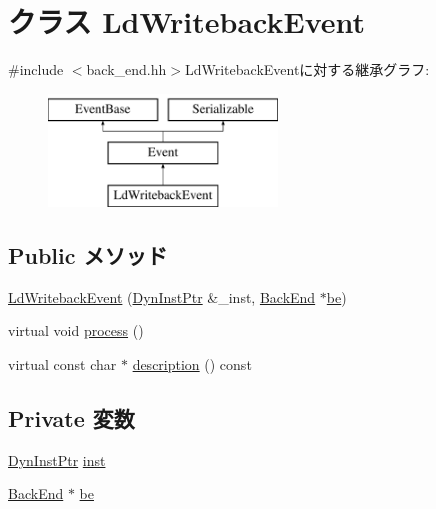 \hypertarget{classBackEnd_1_1LdWritebackEvent}{
\section{クラス LdWritebackEvent}
\label{classBackEnd_1_1LdWritebackEvent}
}


{\ttfamily \#include $<$back\_\-end.hh$>$}LdWritebackEventに対する継承グラフ:\begin{figure}[H]
\begin{center}
\leavevmode
\includegraphics[height=3cm]{classBackEnd_1_1LdWritebackEvent}
\end{center}
\end{figure}
\subsection*{Public メソッド}
\begin{DoxyCompactItemize}
\item 
\hyperlink{classBackEnd_1_1LdWritebackEvent_acb4a3159b31096e59f3c05256151e7e0}{LdWritebackEvent} (\hyperlink{classBackEnd_a028ce10889c5f6450239d9e9a7347976}{DynInstPtr} \&\_\-inst, \hyperlink{classBackEnd}{BackEnd} $\ast$\hyperlink{classBackEnd_1_1LdWritebackEvent_a84f815aa1fa864ba2e6d75f5ad2b52d1}{be})
\item 
virtual void \hyperlink{classBackEnd_1_1LdWritebackEvent_a2e9c5136d19b1a95fc427e0852deab5c}{process} ()
\item 
virtual const char $\ast$ \hyperlink{classBackEnd_1_1LdWritebackEvent_a5a14fe478e2393ff51f02e9b7be27e00}{description} () const 
\end{DoxyCompactItemize}
\subsection*{Private 変数}
\begin{DoxyCompactItemize}
\item 
\hyperlink{classBackEnd_a028ce10889c5f6450239d9e9a7347976}{DynInstPtr} \hyperlink{classBackEnd_1_1LdWritebackEvent_af5d4fb974eeb4507d4c837d365d0cefc}{inst}
\item 
\hyperlink{classBackEnd}{BackEnd} $\ast$ \hyperlink{classBackEnd_1_1LdWritebackEvent_a84f815aa1fa864ba2e6d75f5ad2b52d1}{be}
\end{DoxyCompactItemize}


